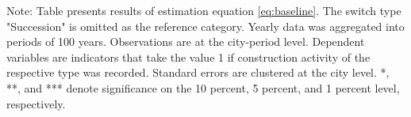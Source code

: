\begin{table}[htbp]
\begin{tabular}{lcccc}
      
   \end{tabular}
   
   \par \raggedright 
   Note: Table presents results of estimation equation \eqref{eq:baseline}. The switch type "Succession" is omitted as the  reference category. Yearly data was aggregated into periods of 100 years. Observations are at the city-period  level. Dependent variables are indicators that take the value 1 if  construction activity of the respective type was recorded. Standard errors are  clustered at the city level. *, **, and *** denote significance on the 10 percent, 5 percent, and 1 percent  level, respectively.
\end{table}
